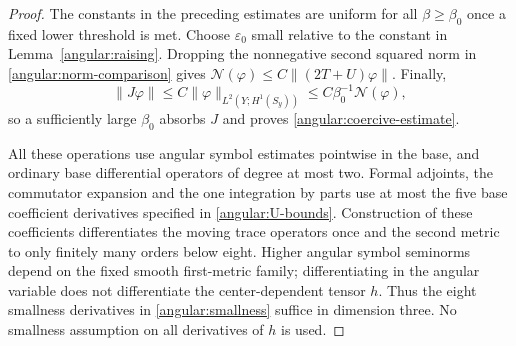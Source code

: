 \documentclass[11pt,a4paper]{article}
\newcommand{\eps}{\varepsilon}
\numberwithin{equation}{section}
\begin{document}
\begin{proof}
The constants in the preceding estimates are uniform for all
$\beta\ge\beta_0$ once a fixed lower threshold is met.  Choose
$\eps_0$ small relative to the constant in
Lemma~\ref{angular:raising}.  Dropping the nonnegative second squared
norm in \eqref{angular:norm-comparison} gives
$\mathcal N(\varphi)\le C\|(2T+U)\varphi\|$.
Finally,
\[
 \|J\varphi\|\le C\|\varphi\|_{L^2(Y;H^1(S_y))}
                         \le C\beta_0^{-1}\mathcal N(\varphi),
\]
so a sufficiently large $\beta_0$ absorbs $J$ and proves
\eqref{angular:coercive-estimate}.

All these operations use angular symbol estimates pointwise in the base,
and ordinary base differential operators of degree at most two.  Formal
adjoints, the commutator expansion and the one integration by parts use
at most the five base coefficient derivatives specified in
\eqref{angular:U-bounds}.  Construction of these coefficients differentiates
the moving trace operators once and the second metric to only finitely
many orders below eight.  Higher angular symbol seminorms depend on the
fixed smooth first-metric family; differentiating in the angular variable
does not differentiate the center-dependent tensor $h$.  Thus the eight
smallness derivatives in \eqref{angular:smallness} suffice in dimension three.  No smallness assumption on all derivatives of $h$ is used.
\end{proof}
\end{document}
